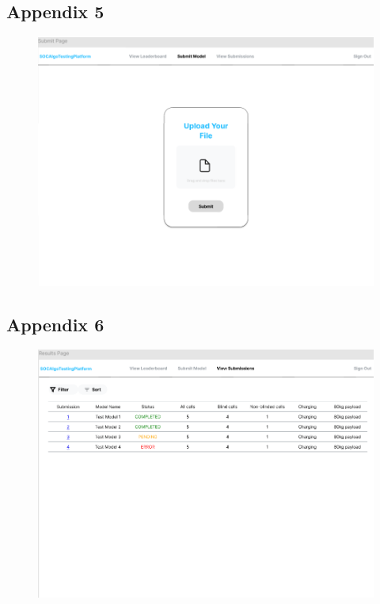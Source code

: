 \documentclass[12pt, titlepage]{article}
\begin{document}
\subsection{Appendix 5} \label{Appendix 5}
\begin{figure}[H]
    \centering
    \includegraphics[width=1\linewidth]{.//Interface/Submit.png}
\end{figure}
\subsection{Appendix 6} \label{Appendix 6}
\begin{figure}[H]
    \centering
    \includegraphics[width=1\linewidth]{.//Interface/Results.png}
\end{figure}
\end{document}
